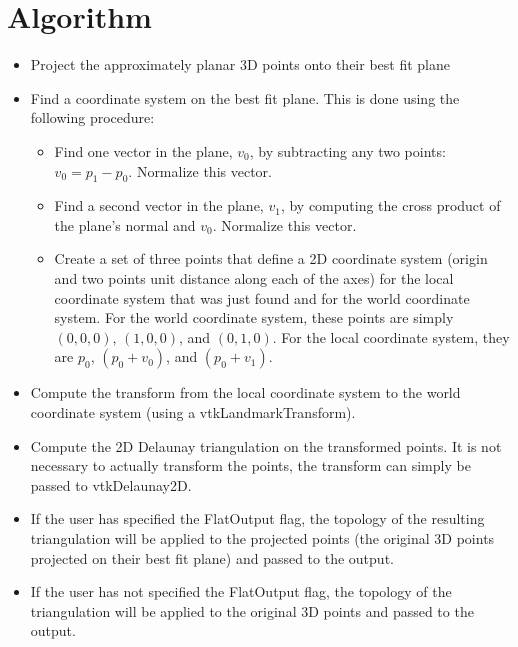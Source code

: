 \documentclass{ComputationalAlgorithmsArticle}
\begin{document}
\section{Algorithm}
\begin{itemize}
 \item Project the approximately planar 3D points onto their best fit plane
 \item Find a coordinate system on the best fit plane. This is done using the following procedure:
  \begin{itemize}
   \item Find one vector in the plane, $v_0$, by subtracting any two points: $v_0 = p_1 - p_0$. Normalize this vector.
   \item Find a second vector in the plane, $v_1$, by computing the cross product of the plane's normal and $v_0$. Normalize this vector.
   \item Create a set of three points that define a 2D coordinate system (origin and two points unit distance along each of the axes) for the local coordinate system that was just found and for the world coordinate system. For the world coordinate system, these points are simply $(0,0,0)$, $(1,0,0)$, and $(0,1,0)$. For the local coordinate system, they are $p_0$, $(p_0 + v_0)$, and $(p_0 + v_1)$.
  \end{itemize}
 \item Compute the transform from the local coordinate system to the world coordinate system (using a vtkLandmarkTransform).
 \item Compute the 2D Delaunay triangulation on the transformed points. It is not necessary to actually transform the points, the transform can simply be passed to vtkDelaunay2D.
 \item If the user has specified the FlatOutput flag, the topology of the resulting triangulation will be applied to the projected points (the original 3D points projected on their best fit plane) and passed to the output.
 \item If the user has not specified the FlatOutput flag, the topology of the triangulation will be applied to the original 3D points and passed to the output.
\end{itemize}

\end{document}
